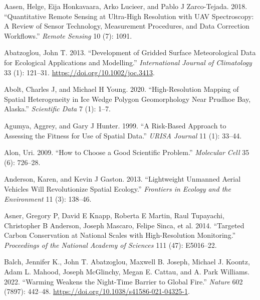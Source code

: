 \documentclass[
  12pt,
]{article}
\newlength{\cslhangindent}
\newlength{\cslentryspacingunit} %
\newenvironment{CSLReferences}[2] %
 {%
  \setlength{\parindent}{0pt}
  \ifodd #1
  \let\oldpar\par
  \def\par{\hangindent=\cslhangindent\oldpar}
  \fi
  \setlength{\parskip}{#2\cslentryspacingunit}
 }%
 {}
\begin{document}
\hypertarget{refs}{}
\begin{CSLReferences}{1}{0}
\leavevmode{}%
Aasen, Helge, Eija Honkavaara, Arko Lucieer, and Pablo J Zarco-Tejada.
2018. {``Quantitative Remote Sensing at Ultra-High Resolution with UAV
Spectroscopy: A Review of Sensor Technology, Measurement Procedures, and
Data Correction Workflows.''} \emph{Remote Sensing} 10 (7): 1091.

\leavevmode{}%
Abatzoglou, John T. 2013. {``Development of Gridded Surface
Meteorological Data for Ecological Applications and Modelling.''}
\emph{International Journal of Climatology} 33 (1): 121--31.
\url{https://doi.org/10.1002/joc.3413}.

\leavevmode{}%
Abolt, Charles J, and Michael H Young. 2020. {``High-Resolution Mapping
of Spatial Heterogeneity in Ice Wedge Polygon Geomorphology Near Prudhoe
Bay, Alaska.''} \emph{Scientific Data} 7 (1): 1--7.

\leavevmode{}%
Agumya, Aggrey, and Gary J Hunter. 1999. {``A Risk-Based Approach to
Assessing the Fitness for Use of Spatial Data.''} \emph{URISA Journal}
11 (1): 33--44.

\leavevmode{}%
Alon, Uri. 2009. {``How to Choose a Good Scientific Problem.''}
\emph{Molecular Cell} 35 (6): 726--28.

\leavevmode{}%
Anderson, Karen, and Kevin J Gaston. 2013. {``Lightweight Unmanned
Aerial Vehicles Will Revolutionize Spatial Ecology.''} \emph{Frontiers
in Ecology and the Environment} 11 (3): 138--46.

\leavevmode{}%
Asner, Gregory P, David E Knapp, Roberta E Martin, Raul Tupayachi,
Christopher B Anderson, Joseph Mascaro, Felipe Sinca, et al. 2014.
{``Targeted Carbon Conservation at National Scales with High-Resolution
Monitoring.''} \emph{Proceedings of the National Academy of Sciences}
111 (47): E5016--22.

\leavevmode{}%
Balch, Jennifer K., John T. Abatzoglou, Maxwell B. Joseph, Michael J.
Koontz, Adam L. Mahood, Joseph McGlinchy, Megan E. Cattau, and A. Park
Williams. 2022. {``Warming Weakens the Night-Time Barrier to Global
Fire.''} \emph{Nature} 602 (7897): 442--48.
\url{https://doi.org/10.1038/s41586-021-04325-1}.


\end{CSLReferences}
\end{document}
